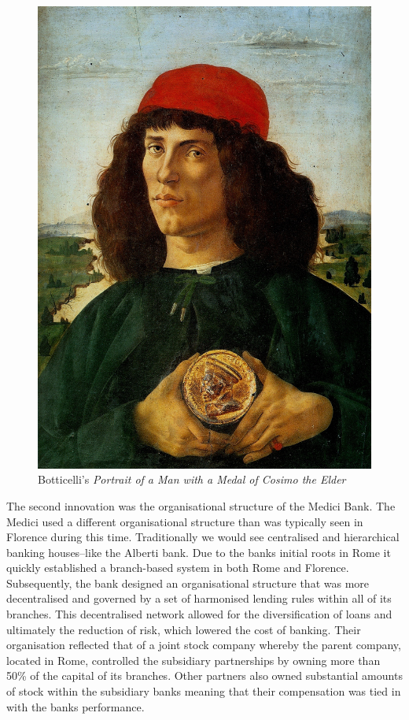\begin{figure}[h!]
\centering
\includegraphics[width=\textwidth,height=0.75\textheight,keepaspectratio]{imgs/botticelli.jpg}
\caption{Botticelli's \emph{Portrait of a Man with a Medal of Cosimo the Elder}}
\label{botticelli}
\end{figure}

The second innovation was the organisational structure of the Medici Bank. The Medici used a different organisational structure than was typically seen in Florence during this time. Traditionally we would see centralised and hierarchical banking houses--like the Alberti bank. Due to the banks initial roots in Rome it quickly established a branch-based system in both Rome and Florence. Subsequently, the bank designed an organisational structure that was more decentralised and governed by a set of harmonised lending rules within all of its branches. This decentralised network allowed for the diversification of loans and ultimately the reduction of risk, which lowered the cost of banking. Their organisation reflected that of a joint stock company whereby the parent company, located in Rome, controlled the subsidiary partnerships by owning more than 50\% of the capital of its branches. Other partners also owned substantial amounts of stock within the subsidiary banks meaning that their compensation was tied in with the banks performance.

